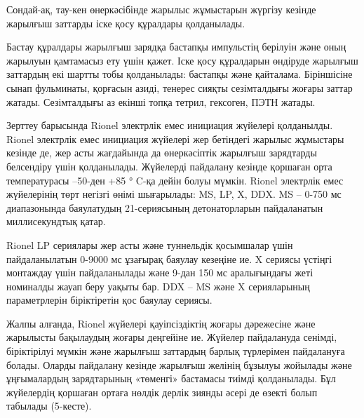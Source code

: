 \begin{multicols}{2}
Сондай-ақ, тау-кен өнеркәсібінде жарылыс жұмыстарын жүргізу кезінде
жарылғыш заттарды іске қосу құралдары қолданылады.

Бастау құралдары жарылғыш зарядқа бастапқы импульстің берілуін және оның
жарылуын қамтамасыз ету үшін қажет. Іске қосу құралдарын өндіруде
жарылғыш заттардың екі шартты тобы қолданылады: бастапқы және қайталама.
Біріншісіне сынап фульминаты, қорғасын азиді, тенерес сияқты
сезімталдығы жоғары заттар жатады. Сезімталдығы аз екінші топқа тетрил,
гексоген, ПЭТН жатады.

Зерттеу барысында Rionel электрлік емес инициация жүйелері қолданылды.
Rionel электрлік емес инициация жүйелері жер бетіндегі жарылыс жұмыстары
кезінде де, жер асты жағдайында да өнеркәсіптік жарылғыш зарядтарды
белсендіру үшін қолданылады. Жүйелерді пайдалану кезінде қоршаған орта
температурасы --50-ден +85 ° C-қа дейін болуы мүмкін. Rionel электрлік
емес жүйелерінің төрт негізгі өнімі шығарылады: MS, LP, X, DDX. MS --
0-750 мс диапазонында баяулатудың 21-сериясының детонаторларын
пайдаланатын миллисекундтық қатар.

Rionel LP сериялары жер асты және туннельдік қосымшалар үшін
пайдаланылатын 0-9000 мс ұзағырақ баяулау кезеңіне ие. X сериясы үстіңгі
монтаждау үшін пайдаланылады және 9-дан 150 мс аралығындағы жеті
номиналды жауап беру уақыты бар. DDX -- MS және X серияларының
параметрлерін біріктіретін қос баяулау сериясы.

Жалпы алғанда, Rionel жүйелері қауіпсіздіктің жоғары дәрежесіне және
жарылысты бақылаудың жоғары деңгейіне ие. Жүйелер пайдалануда сенімді,
біріктірілуі мүмкін және жарылғыш заттардың барлық түрлерімен
пайдалануға болады. Оларды пайдалану кезінде жарылғыш желінің бұзылуы
жойылады және ұңғымалардың зарядтарының «төменгі» бастамасы тиімді
қолданылады. Бұл жүйелердің қоршаған ортаға нөлдік дерлік зиянды әсері
де өзекті болып табылады (5-кесте).
\end{multicols}

